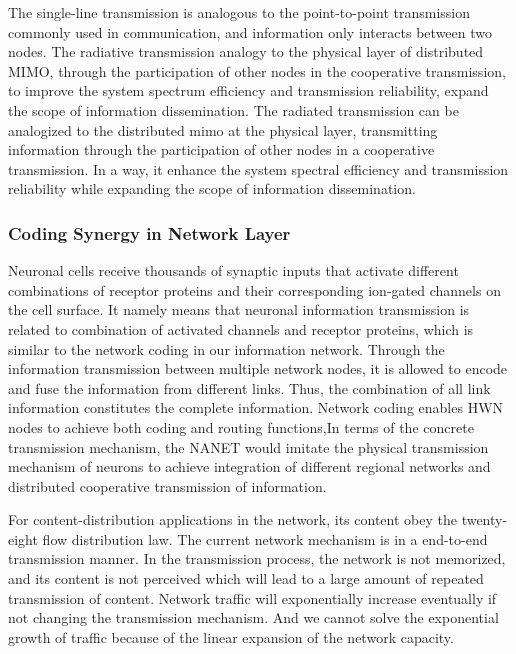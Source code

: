 \documentclass[journal,comsoc]{IEEEtran}
\begin{document}
				The single-line transmission is analogous to the point-to-point transmission commonly used in communication, and information only interacts between two nodes.
				The radiative transmission analogy to the physical layer of distributed MIMO, through the participation of other nodes in the cooperative transmission, to improve the system spectrum efficiency and transmission reliability, expand the scope of information dissemination.
				The radiated transmission can be analogized to the distributed mimo at the physical layer, transmitting information through the participation of other nodes in a cooperative transmission.
				In a way, it enhance the system spectral efficiency and transmission reliability while expanding the scope of information dissemination.
				
			\subsubsection{Coding Synergy in Network Layer}
				Neuronal cells receive thousands of synaptic inputs that activate different combinations of receptor proteins and their corresponding ion-gated channels on the cell surface.
				It namely means that neuronal information transmission is related to combination of activated channels and receptor proteins, which is similar to the network coding in our information network. 
				Through the information transmission between multiple network nodes, it is allowed to encode and fuse the information from different links. 
				Thus, the combination of all link information constitutes the complete information.
				Network coding enables HWN nodes to achieve both coding and routing functions,In terms of the concrete transmission mechanism, the NANET would imitate the physical transmission mechanism of neurons 
				to achieve integration of different regional networks and distributed cooperative transmission of information.
				
				For content-distribution applications in the network, its content obey the twenty-eight flow distribution law.
				The current network mechanism is in a end-to-end transmission manner. 
				In the transmission process, the network is not memorized, and its content is not perceived which will lead to a large amount of repeated transmission of content.
				Network traffic will exponentially increase eventually if not changing the transmission mechanism. 
				And we cannot solve the exponential growth of traffic because of the linear expansion of the network capacity.
				
\end{document}
